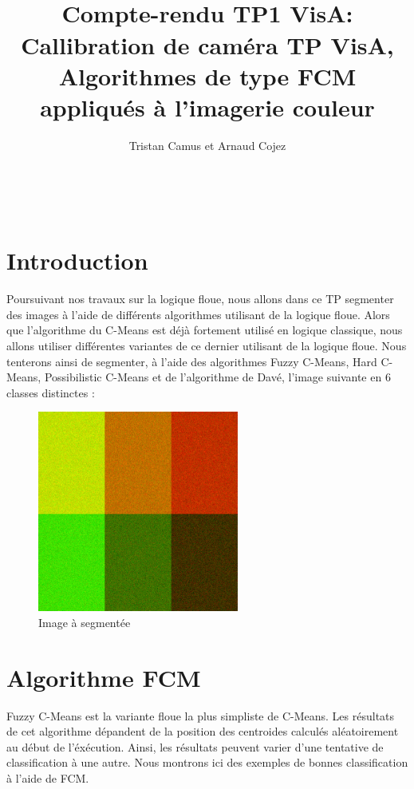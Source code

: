 \documentclass[a4paper,11pt]{article}
\title{
  \noindent\hrulefill \\
  \vspace{10mm} Compte-rendu TP1 VisA: Callibration de caméra
}
\title{TP VisA, Algorithmes de type FCM appliqués à l'imagerie couleur}
\author{Tristan Camus et Arnaud Cojez}
\date{}
\begin{document}
\maketitle

\noindent\hrulefill \\

\section{Introduction}

Poursuivant nos travaux sur la logique floue, nous allons dans ce TP segmenter des images à l'aide de différents algorithmes utilisant de la logique floue.
Alors que l'algorithme du C-Means est déjà fortement utilisé en logique classique, nous allons utiliser différentes variantes de ce dernier utilisant de la logique floue. Nous tenterons ainsi de segmenter, à l'aide des algorithmes Fuzzy C-Means, Hard C-Means, Possibilistic C-Means et de l'algorithme de Davé, l'image suivante en 6 classes distinctes :

\begin{figure}[H]
\begin{center}
\includegraphics[width=250px]{../img/6_classes_RGB.png}
\end{center}
\caption{Image à segmentée}
\end{figure}

\clearpage

\section{Algorithme FCM}
Fuzzy C-Means est la variante floue la plus simpliste de C-Means. Les résultats de cet algorithme dépandent de la position des centroides calculés aléatoirement au début de l'éxécution. Ainsi, les résultats peuvent varier d'une tentative de classification à une autre. Nous montrons ici des exemples de bonnes classification à l'aide de FCM.
\end{document}
